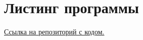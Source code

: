\documentclass[12pt]{report}
\begin{document}
	
	\section*{Листинг программы}
	\href{https://github.com/mysticslippers/information_systems_archive/tree/main/%D0%A1ourse_work/%D0%9A%D1%83%D1%80%D1%81%D0%BE%D0%B2%D0%B0%D1%8F%20%D1%80%D0%B0%D0%B1%D0%BE%D1%82%D0%B0%2C%20%D0%AD%D1%82%D0%B0%D0%BF%20%E2%84%962/code}{Ссылка на репозиторий с кодом.}
	
\end{document}
